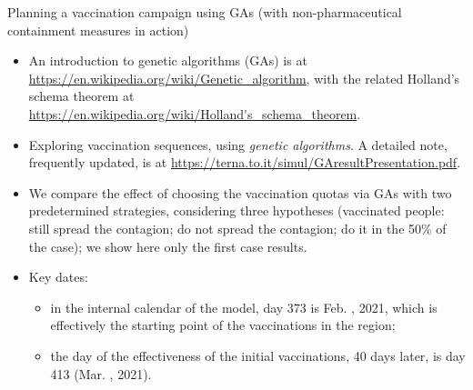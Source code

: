 \documentclass[8pt]{beamer}
\begin{document}
\begin{frame}{Planning a vaccination campaign using GAs (with non-pharmaceutical containment measures in action)}

\begin{itemize}

\item An introduction to genetic algorithms (GAs) is at \url{https://en.wikipedia.org/wiki/Genetic_algorithm}, with the related Holland's schema theorem at 
\url{https://en.wikipedia.org/wiki/Holland's_schema_theorem}.

\bigskip

\item Exploring vaccination sequences, using \emph{genetic algorithms}. A detailed note, frequently updated, is at \url{https://terna.to.it/simul/GAresultPresentation.pdf}.

\bigskip

\item We compare the effect of choosing the vaccination quotas via GAs with two predetermined strategies, considering three hypotheses (vaccinated people: still spread the contagion; do not spread the contagion; do it in the 50\% of the case); we show here only the first case results.

\bigskip

\item Key dates: 
\begin{itemize}
\item in the internal calendar of the model, day 373 is Feb. , 2021, which is effectively the starting point of the vaccinations in the region; 

\item the day of the effectiveness of the initial vaccinations, 40 days later, is day 413 (Mar. , 2021).
\end{itemize}

\end{itemize}

\end{frame}
\end{document}
